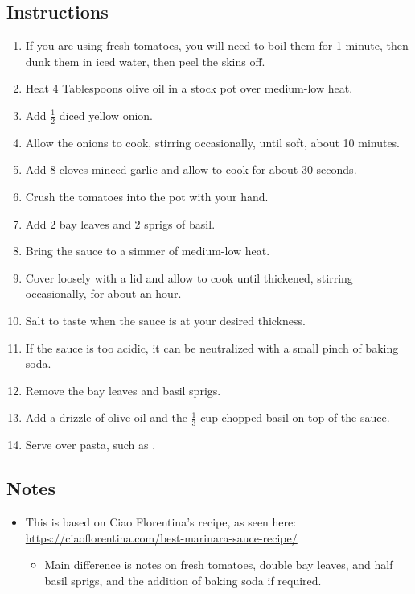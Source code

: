 \begin{multicols}{2}
\subsection*{Instructions}
\begin{enumerate}
    \item If you are using fresh tomatoes, you will need to boil them for 1 minute, then dunk them in iced water, then peel the skins off.
    \item Heat 4 Tablespoons olive oil in a stock pot over medium-low heat.
    \item Add \( \frac{1}{2} \) diced yellow onion.
    \item Allow the onions to cook, stirring occasionally, until soft, about 10 minutes.
    \item Add 8 cloves minced garlic and allow to cook for about 30 seconds.
    \item Crush the tomatoes into the pot with your hand.
    \item Add 2 bay leaves and 2 sprigs of basil.
    \item Bring the sauce to a simmer of medium-low heat.
    \item Cover loosely with a lid and allow to cook until thickened, stirring occasionally, for about an hour.
    \item Salt to taste when the sauce is at your desired thickness.
    \item If the sauce is too acidic, it can be neutralized with a small pinch of baking soda.
    \item Remove the bay leaves and basil sprigs.
    \item Add a drizzle of olive oil and the \( \frac{1}{3} \) cup chopped basil on top of the sauce.
    \item Serve over pasta, such as .

\end{enumerate}

\subsection*{Notes}
\begin{itemize}
    \item This is based on Ciao Florentina's recipe, as seen here: \url{https://ciaoflorentina.com/best-marinara-sauce-recipe/}
    \begin{itemize}
        \item Main difference is notes on fresh tomatoes, double bay leaves, and half basil sprigs, and the addition of baking soda if required.
    \end{itemize}
\end{itemize}
\end{multicols}
\clearpage